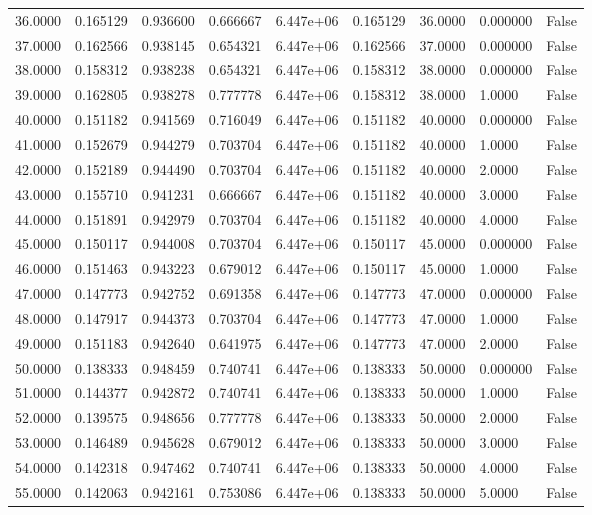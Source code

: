 \documentclass[11pt]{report}
\begin{document}
\begin{longtable}{lllllllll}
36.0000 & 0.165129 & 0.936600 & 0.666667 & 6.447e+06 & 0.165129 & 36.0000 & 0.000000 & False \\
37.0000 & 0.162566 & 0.938145 & 0.654321 & 6.447e+06 & 0.162566 & 37.0000 & 0.000000 & False \\
38.0000 & 0.158312 & 0.938238 & 0.654321 & 6.447e+06 & 0.158312 & 38.0000 & 0.000000 & False \\
39.0000 & 0.162805 & 0.938278 & 0.777778 & 6.447e+06 & 0.158312 & 38.0000 & 1.0000 & False \\
40.0000 & 0.151182 & 0.941569 & 0.716049 & 6.447e+06 & 0.151182 & 40.0000 & 0.000000 & False \\
41.0000 & 0.152679 & 0.944279 & 0.703704 & 6.447e+06 & 0.151182 & 40.0000 & 1.0000 & False \\
42.0000 & 0.152189 & 0.944490 & 0.703704 & 6.447e+06 & 0.151182 & 40.0000 & 2.0000 & False \\
43.0000 & 0.155710 & 0.941231 & 0.666667 & 6.447e+06 & 0.151182 & 40.0000 & 3.0000 & False \\
44.0000 & 0.151891 & 0.942979 & 0.703704 & 6.447e+06 & 0.151182 & 40.0000 & 4.0000 & False \\
45.0000 & 0.150117 & 0.944008 & 0.703704 & 6.447e+06 & 0.150117 & 45.0000 & 0.000000 & False \\
46.0000 & 0.151463 & 0.943223 & 0.679012 & 6.447e+06 & 0.150117 & 45.0000 & 1.0000 & False \\
47.0000 & 0.147773 & 0.942752 & 0.691358 & 6.447e+06 & 0.147773 & 47.0000 & 0.000000 & False \\
48.0000 & 0.147917 & 0.944373 & 0.703704 & 6.447e+06 & 0.147773 & 47.0000 & 1.0000 & False \\
49.0000 & 0.151183 & 0.942640 & 0.641975 & 6.447e+06 & 0.147773 & 47.0000 & 2.0000 & False \\
50.0000 & 0.138333 & 0.948459 & 0.740741 & 6.447e+06 & 0.138333 & 50.0000 & 0.000000 & False \\
51.0000 & 0.144377 & 0.942872 & 0.740741 & 6.447e+06 & 0.138333 & 50.0000 & 1.0000 & False \\
52.0000 & 0.139575 & 0.948656 & 0.777778 & 6.447e+06 & 0.138333 & 50.0000 & 2.0000 & False \\
53.0000 & 0.146489 & 0.945628 & 0.679012 & 6.447e+06 & 0.138333 & 50.0000 & 3.0000 & False \\
54.0000 & 0.142318 & 0.947462 & 0.740741 & 6.447e+06 & 0.138333 & 50.0000 & 4.0000 & False \\
55.0000 & 0.142063 & 0.942161 & 0.753086 & 6.447e+06 & 0.138333 & 50.0000 & 5.0000 & False \\

\end{longtable}
\end{document}
